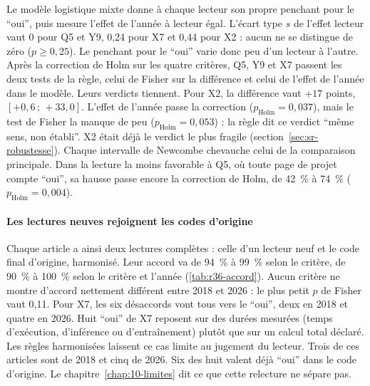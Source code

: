 
Le modèle logistique mixte donne à chaque lecteur son propre penchant pour le \enquote{oui}, puis
mesure l'effet de l'année à lecteur égal. L'écart type $s$ de l'effet lecteur vaut 0 pour Q5 et Y9, 0,24 pour
X7 et 0,44 pour X2 : aucun ne se distingue de zéro ($p \geq 0{,}25$). Le penchant pour le
\enquote{oui} varie donc peu d'un lecteur à l'autre. Après la correction de Holm sur les quatre
critères, Q5, Y9 et X7 passent les deux tests de la règle, celui de Fisher sur la différence et
celui de l'effet de l'année dans le modèle. Leurs verdicts tiennent. Pour X2, la différence vaut
$+17$ points, $[+0{,}6\,;\,+33{,}0]$. L'effet de l'année passe la correction
($p_{\text{Holm}} = 0{,}037$), mais le test de Fisher la manque de peu ($p_{\text{Holm}} = 0{,}053$) :
la règle dit ce verdict \enquote{même sens, non établi}. X2 était déjà le verdict le plus fragile
(section~\ref{sec:sr-robustesse}). Chaque intervalle de Newcombe chevauche celui de la comparaison
principale. Dans la lecture la moins favorable à Q5, où toute page de projet compte \enquote{oui},
sa hausse passe encore la correction de Holm, de 42~\% à 74~\% ($p_{\text{Holm}} = 0{,}004$).

\paragraph{Les lectures neuves rejoignent les codes d'origine}
Chaque article a ainsi deux lectures complètes : celle d'un lecteur neuf et le code final d'origine,
harmonisé. Leur accord va de 94~\% à 99~\% selon le critère, de 90~\% à 100~\% selon le critère et
l'année (\cref{tab:r36-accord}). Aucun critère ne montre d'accord nettement différent entre 2018 et
2026 : le plus petit $p$ de Fisher vaut 0,11. Pour X7, les six désaccords vont tous vers le
\enquote{oui}, deux en 2018 et quatre en 2026. Huit \enquote{oui} de X7 reposent sur des durées
mesurées (temps d'exécution, d'inférence ou d'entraînement) plutôt que sur un calcul total déclaré.
Les règles harmonisées laissent ce cas limite au jugement du lecteur. Trois de ces articles sont de 2018 et cinq de
2026. Six des huit valent déjà \enquote{oui} dans le code d'origine. Le
chapitre~\ref{chap:10-limites} dit ce que cette relecture ne sépare pas.


